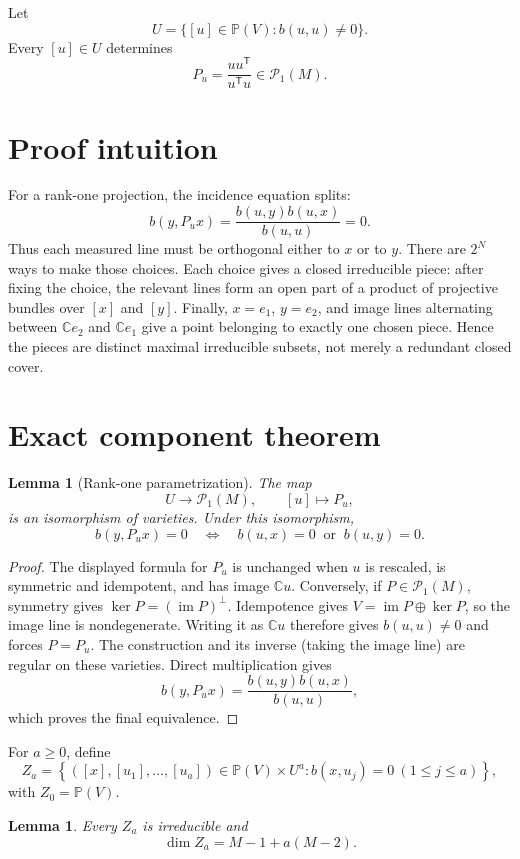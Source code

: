 \documentclass[11pt]{article}
\newtheorem{lemma}[theorem]{Lemma}
\newcommand{\PP}{\mathbb P}
\newcommand{\CC}{\mathbb C}
\newcommand{\cP}{\mathcal P}
\begin{document}
Let
\[
  U=\{[u]\in\PP(V):b(u,u)\ne0\}.
\]
Every $[u]\in U$ determines
\[
  P_u=\frac{uu^{\mathsf T}}{u^{\mathsf T}u}\in\cP_1(M).
\]

\section{Proof intuition}

For a rank-one projection, the incidence equation splits:
\[
 b(y,P_u x)=\frac{b(u,y)b(u,x)}{b(u,u)}=0.
\]
Thus each measured line must be orthogonal either to $x$ or to $y$.
There are $2^N$ ways to make those choices.  Each choice gives a closed
irreducible piece: after fixing the choice, the relevant lines form an open
part of a product of projective bundles over $[x]$ and $[y]$.  Finally,
$x=e_1$, $y=e_2$, and image lines alternating between $\CC e_2$ and
$\CC e_1$ give a point belonging to exactly one chosen piece.  Hence the
pieces are distinct maximal irreducible subsets, not merely a redundant
closed cover.

\section{Exact component theorem}

\begin{lemma}[Rank-one parametrization]\label{lem:param}
The map
\[
 U\longrightarrow\cP_1(M),\qquad [u]\longmapsto P_u,
\]
is an isomorphism of varieties.  Under this isomorphism,
\[
 b(y,P_u x)=0
 \quad\Longleftrightarrow\quad
 b(u,x)=0\ \text{ or }\ b(u,y)=0.
\]
\end{lemma}

\begin{proof}
The displayed formula for $P_u$ is unchanged when $u$ is rescaled, is
symmetric and idempotent, and has image $\CC u$.  Conversely, if
$P\in\cP_1(M)$, symmetry gives
$\ker P=(\operatorname{im}P)^\perp$.  Idempotence gives
$V=\operatorname{im}P\oplus\ker P$, so the image line is nondegenerate.
Writing it as $\CC u$ therefore gives $b(u,u)\ne0$ and forces
$P=P_u$.  The construction and its inverse (taking the image line) are
regular on these varieties.  Direct multiplication gives
\[
 b(y,P_u x)=\frac{b(u,y)b(u,x)}{b(u,u)},
\]
which proves the final equivalence.
\end{proof}

For $a\geq0$, define
\[
 Z_a=\left\{([x],[u_1],\ldots,[u_a])\in
 \PP(V)\times U^a:b(x,u_j)=0\ (1\leq j\leq a)\right\},
\]
with $Z_0=\PP(V)$.

\begin{lemma}\label{lem:Za}
Every $Z_a$ is irreducible and
\[
 \dim Z_a=M-1+a(M-2).
\]
\end{lemma}
\end{document}
